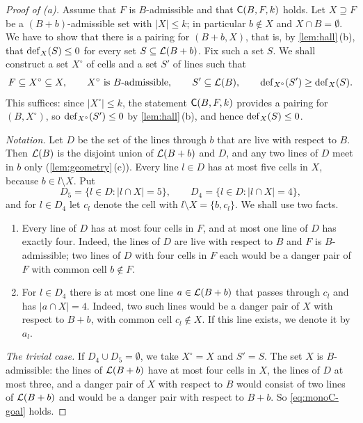 \begin{proof}[Proof of \textup{(a)}]
Assume that $F$ is $B$-admissible and that $\mathsf{C}(B,F,k)$ holds. Let $X\supseteq F$ be a
$(B+b)$-admissible set with $|X|\le k$; in particular $b\notin X$ and $X\cap B=\emptyset$. We have to show
that there is a pairing for $(B+b,X)$, that is, by \cref{lem:hall}\,(b), that $\operatorname{def}_X(S)\le 0$ for every
set $S\subseteq\mathcal{L}(B+b)$. Fix such a set $S$. We shall construct a set $X^\circ$ of cells and a set
$S'$ of lines such that
\begin{equation}\label{eq:monoC-goal}
  F\subseteq X^\circ\subseteq X,\qquad X^\circ\text{ is $B$-admissible},\qquad S'\subseteq\mathcal{L}(B),\qquad
  \operatorname{def}_{X^\circ}(S')\ge\operatorname{def}_X(S).
\end{equation}
This suffices: since $|X^\circ|\le k$, the statement $\mathsf{C}(B,F,k)$ provides a pairing for $(B,X^\circ)$, so
$\operatorname{def}_{X^\circ}(S')\le 0$ by \cref{lem:hall}\,(b), and hence $\operatorname{def}_X(S)\le 0$.

\smallskip\noindent\emph{Notation.}
Let $D$ be the set of the lines through $b$ that are live with respect to $B$. Then $\mathcal{L}(B)$ is the
disjoint union of $\mathcal{L}(B+b)$ and $D$, and any two lines of $D$ meet in $b$ only
(\cref{lem:geometry}\,(c)). Every line $l\in D$ has at most five cells in $X$, because $b\in l\setminus X$.
Put
\[
  D_5=\{l\in D : |l\cap X|=5\},\qquad D_4=\{l\in D : |l\cap X|=4\},
\]
and for $l\in D_4$ let $c_l$ denote the cell with $l\setminus X=\{b,c_l\}$. We shall use two facts.
\begin{enumerate}
\item[\textup{($\alpha$)}] Every line of $D$ has at most four cells in $F$, and at most one line of $D$ has exactly four.
      Indeed, the lines of $D$ are live with respect to $B$ and $F$ is $B$-admissible; two lines of $D$
      with four cells in $F$ each would be a danger pair of $F$ with common cell $b\notin F$.
\item[\textup{($\beta$)}] For $l\in D_4$ there is at most one line $a\in\mathcal{L}(B+b)$ that passes through $c_l$ and has
      $|a\cap X|=4$. Indeed, two such lines would be a danger pair of $X$ with respect to $B+b$, with
      common cell $c_l\notin X$. If this line exists, we denote it by $a_l$.
\end{enumerate}

\smallskip\noindent\emph{The trivial case.}
If $D_4\cup D_5=\emptyset$, we take $X^\circ=X$ and $S'=S$. The set $X$ is $B$-admissible: the lines of
$\mathcal{L}(B+b)$ have at most four cells in $X$, the lines of $D$ at most three, and a danger pair of $X$
with respect to $B$ would consist of two lines of $\mathcal{L}(B+b)$ and would be a danger pair with respect
to $B+b$. So \eqref{eq:monoC-goal} holds.


\end{proof}
